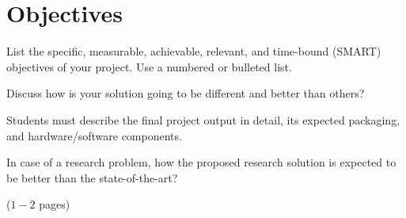 
\chapter{Objectives}
\label{Chapter3}

List the specific, measurable, achievable, relevant, and time-bound (SMART) objectives of your project. Use a numbered or bulleted list.

Discuss how is your solution going to be different and better than others? 

Students must describe the final project output in detail, its expected packaging, and hardware/software components. 

In case of a research problem, how the proposed research solution is expected to be better than the state-of-the-art? 

($1-2$ pages)
